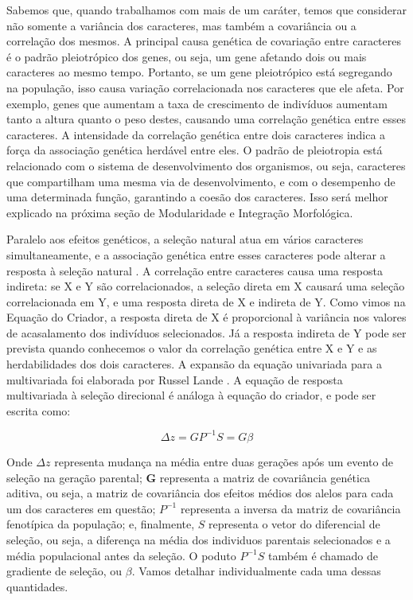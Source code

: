 \documentclass[portuges,]{tufte-handout}
\begin{document}
Sabemos que, quando trabalhamos com mais de um caráter, temos que
considerar não somente a variância dos caracteres, mas também a
covariância ou a correlação dos mesmos. A principal causa genética de
covariação entre caracteres é o padrão pleiotrópico dos genes, ou seja,
um gene afetando dois ou mais caracteres ao mesmo tempo. Portanto, se um
gene pleiotrópico está segregando na população, isso causa variação
correlacionada nos caracteres que ele afeta. Por exemplo, genes que
aumentam a taxa de crescimento de indivíduos aumentam tanto a altura
quanto o peso destes, causando uma correlação genética entre esses
caracteres. A intensidade da correlação genética entre dois caracteres
indica a força da associação genética herdável entre eles. O padrão de
pleiotropia está relacionado com o sistema de desenvolvimento dos
organismos, ou seja, caracteres que compartilham uma mesma via de
desenvolvimento, e com o desempenho de uma determinada função,
garantindo a coesão dos caracteres. Isso será melhor explicado na
próxima seção de Modularidade e Integração Morfológica.

Paralelo aos efeitos genéticos, a seleção natural atua em vários
caracteres simultaneamente, e a associação genética entre esses
caracteres pode alterar a resposta à seleção natural
\cite{Lande1983a}. A correlação entre caracteres causa uma resposta
indireta: se X e Y são correlacionados, a seleção direta em X causará
uma seleção correlacionada em Y, e uma resposta direta de X e indireta
de Y. Como vimos na Equação do Criador, a resposta direta de X é
proporcional à variância nos valores de acasalamento dos indivíduos
selecionados. Já a resposta indireta de Y pode ser prevista quando
conhecemos o valor da correlação genética entre X e Y e as
herdabilidades dos dois caracteres. A expansão da equação univariada
para a multivariada foi elaborada por Russel Lande \cite{Lande1979}.
A equação de resposta multivariada à seleção direcional é análoga à
equação do criador, e pode ser escrita como:

\[
\Delta z = GP^{-1}S = G\beta
\]

Onde \(\Delta z\) representa mudança na média entre duas gerações após
um evento de seleção na geração parental; \(\mathbf{G}\) representa a
matriz de covariância genética aditiva, ou seja, a matriz de covariância
dos efeitos médios dos alelos para cada um dos caracteres em questão;
\(P^{-1}\) representa a inversa da matriz de covariância fenotípica da
população; e, finalmente, \(S\) representa o vetor do diferencial de
seleção, ou seja, a diferença na média dos individuos parentais
selecionados e a média populacional antes da seleção. O poduto
\(P^{-1}S\) também é chamado de gradiente de seleção, ou \(\beta\).
Vamos detalhar individualmente cada uma dessas quantidades.
\end{document}

